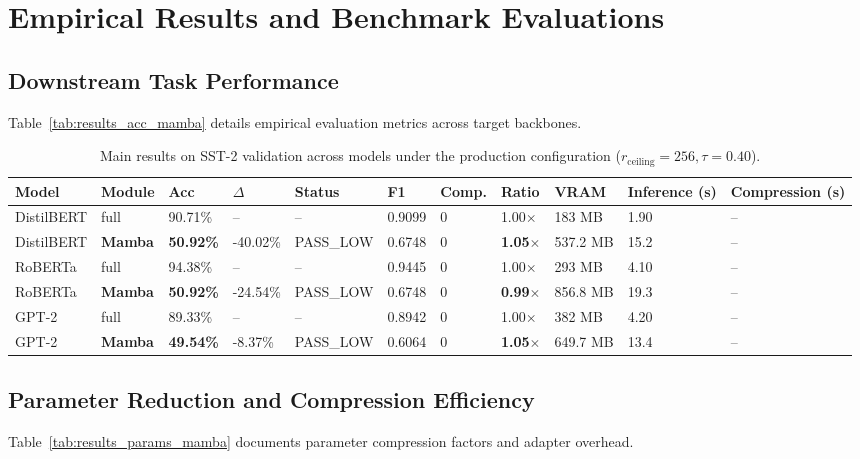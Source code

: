\section{Empirical Results and Benchmark Evaluations}

\subsection{Downstream Task Performance}
Table~\ref{tab:results_acc_mamba} details empirical evaluation metrics across target backbones.

\begin{table}[t]
\centering
\small
\begin{tabular}{lllllllllll}
\toprule
\textbf{Model} & \textbf{Module} & \textbf{Acc} & \textbf{$\Delta$} & \textbf{Status} & \textbf{F1} & \textbf{Comp.} & \textbf{Ratio} & \textbf{VRAM} & \textbf{Inference (s)} & \textbf{Compression (s)} \\
\midrule
DistilBERT & full & 90.71\% & -- & -- & 0.9099 & 0 & 1.00$\times$ & 183 MB & 1.90 & -- \\
DistilBERT & \textbf{Mamba} & \textbf{50.92\%} & -40.02\% & PASS_LOW & 0.6748 & 0 & \textbf{1.05$\times$} & 537.2 MB & 15.2 & -- \\
RoBERTa & full & 94.38\% & -- & -- & 0.9445 & 0 & 1.00$\times$ & 293 MB & 4.10 & -- \\
RoBERTa & \textbf{Mamba} & \textbf{50.92\%} & -24.54\% & PASS_LOW & 0.6748 & 0 & \textbf{0.99$\times$} & 856.8 MB & 19.3 & -- \\
GPT-2 & full & 89.33\% & -- & -- & 0.8942 & 0 & 1.00$\times$ & 382 MB & 4.20 & -- \\
GPT-2 & \textbf{Mamba} & \textbf{49.54\%} & -8.37\% & PASS_LOW & 0.6064 & 0 & \textbf{1.05$\times$} & 649.7 MB & 13.4 & -- \\
\bottomrule
\end{tabular}
\caption{Main results on SST-2 validation across models under the production configuration ($r_{\mathrm{ceiling}}=256, \tau=0.40$).}
\label{tab:main_sst2}
\end{table}

\subsection{Parameter Reduction and Compression Efficiency}
Table~\ref{tab:results_params_mamba} documents parameter compression factors and adapter overhead.

